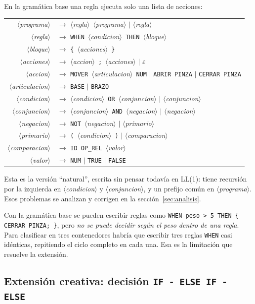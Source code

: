 \documentclass[10pt,a4paper]{article}
\newcommand{\nt}[1]{\ensuremath{\langle}\textit{#1}\ensuremath{\rangle}}   %
\newcommand{\tm}[1]{\texttt{#1}}                                          %
\begin{document}
En la gramática base una regla ejecuta solo una lista de acciones:

\begin{center}\small
\begin{tabular}{@{}rl@{}}
\nt{programa} & $\rightarrow$ \nt{regla}\ \nt{programa} $\mid$ \nt{regla} \\
\nt{regla} & $\rightarrow$ \tm{WHEN}\ \nt{condicion}\ \tm{THEN}\ \nt{bloque} \\
\nt{bloque} & $\rightarrow$ \tm{\{}\ \nt{acciones}\ \tm{\}} \\
\nt{acciones} & $\rightarrow$ \nt{accion}\ \tm{;}\ \nt{acciones} $\mid$ $\varepsilon$ \\
\nt{accion} & $\rightarrow$ \tm{MOVER}\ \nt{articulacion}\ \tm{NUM} $\mid$ \tm{ABRIR}\ \tm{PINZA} $\mid$ \tm{CERRAR}\ \tm{PINZA} \\
\nt{articulacion} & $\rightarrow$ \tm{BASE} $\mid$ \tm{BRAZO} \\
\nt{condicion} & $\rightarrow$ \nt{condicion}\ \tm{OR}\ \nt{conjuncion} $\mid$ \nt{conjuncion} \\
\nt{conjuncion} & $\rightarrow$ \nt{conjuncion}\ \tm{AND}\ \nt{negacion} $\mid$ \nt{negacion} \\
\nt{negacion} & $\rightarrow$ \tm{NOT}\ \nt{negacion} $\mid$ \nt{primario} \\
\nt{primario} & $\rightarrow$ \tm{(}\ \nt{condicion}\ \tm{)} $\mid$ \nt{comparacion} \\
\nt{comparacion} & $\rightarrow$ \tm{ID}\ \tm{OP\_REL}\ \nt{valor} \\
\nt{valor} & $\rightarrow$ \tm{NUM} $\mid$ \tm{TRUE} $\mid$ \tm{FALSE} \\
\end{tabular}
\end{center}

Esta es la versión ``natural'', escrita sin pensar todavía en LL(1): tiene recursión por la
izquierda en \nt{condicion} y \nt{conjuncion}, y un prefijo común en \nt{programa}. Esos
problemas se analizan y corrigen en la sección~\ref{sec:analisis}.

Con la gramática base se pueden escribir reglas como \tm{WHEN peso > 5 THEN \{ CERRAR PINZA; \}},
pero \emph{no se puede decidir según el peso dentro de una regla}. Para clasificar en tres
contenedores habría que escribir tres reglas \tm{WHEN} casi idénticas, repitiendo el ciclo
completo en cada una. Esa es la limitación que resuelve la extensión.

\subsection{Extensión creativa: decisión \texttt{IF - ELSE IF - ELSE}}
\label{sec:extension}
\end{document}
